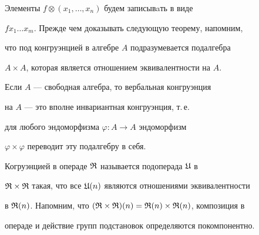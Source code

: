 




Элементы $f\otimes(x_1,\dotsc,x_n)$ будем записывaть в виде


$fx_1\dotsc x_m$. Прежде чем доказывать следующую теорему, напомним,


что под конгруэнцией в алгебре $A$ подразумевается подалгебра


$A\times A$, которая является отношением эквивалентности на $A$.


Если $A$ --- свободная алгебра, то вербальная конгруэнция


на $A$ --- это вполне инвариантная конгруэнция, т.\,е.


для любого эндоморфизма $\varphi:A\to A$ эндоморфизм


$\varphi\times \varphi$ переводит эту подалгебру в себя.


Когруэнцией в операде $\frak R$ называется подоперада $\frak U$ в


$\frak R\times \frak R$ такая, что все $\frak U(n)$ являются отношениями эквивалентности


в $\frak R(n)$. Напомним, что $(\frak R\times\frak R)(n)=\frak R(n)\times\frak R(n)$, композиция в


операде и действие групп подстановок определяются покомпонентно.








